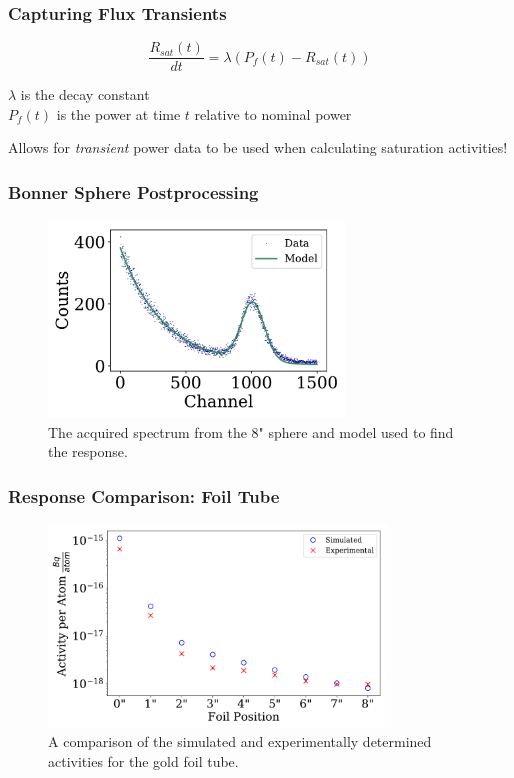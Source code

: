 \documentclass[fleqn]{beamer}
\begin{document}
\begin{frame}
\frametitle{Capturing Flux Transients}

\begin{equation}
\label{eqn:bateman_r_sat}
\frac{R_{sat}(t)}{dt} = \lambda (P_{f}(t) - R_{sat}(t))
\end{equation}

$\lambda$ is the decay constant\\
$P_f(t)$ is the power at time $t$ relative to nominal power

\vspace{0.05\textheight}

Allows for {\it transient} power data to be used when calculating saturation activities!

\end{frame}


\begin{frame}
\frametitle{Bonner Sphere Postprocessing}

\begin{figure}
\centering
\includegraphics[width = 0.7\textwidth]{bs4_spectrum}
\caption{The acquired spectrum from the 8" sphere and model used to find the response.}
\end{figure}

\end{frame}

\begin{frame}
\frametitle{Response Comparison: Foil Tube}

\begin{figure}
\centering
\includegraphics[width = 0.8\textwidth]{compare_activities}
\caption{A comparison of the simulated and experimentally determined activities for the gold foil tube.}
\end{figure}

\end{frame}
\end{document}
